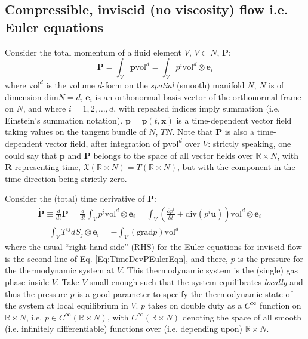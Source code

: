 \documentclass[10pt]{amsart}
\begin{document}
\begin{multicols*}{2}
\subsection{Compressible, inviscid (no viscosity) flow i.e. Euler equations}

Consider the total momentum of a fluid element $V$, $V \subset N$, $\mathbf{P}$:
\begin{equation}
  \mathbf{P} = \int_V \mathbf{p} \text{vol}^d = \int_V p^i \text{vol}^d \otimes \mathbf{e}_i
\end{equation}
where $\text{vol}^d$ is the volume $d$-form on the \emph{spatial} (smooth) manifold $N$, $N$ is of dimension $\text{dim}N = d$, $\mathbf{e}_i$ is an orthonormal basis vector of the orthonormal frame on $N$, and where $i=1,2, \dots , d$, with repeated indices imply summation (i.e. Einstein's summation notation).  $\mathbf{p} = \mathbf{p}(t,\mathbf{x})$ is a time-dependent vector field taking values on the tangent bundle of $N$, $TN$.  Note that $\mathbf{P}$ is also a time-dependent vector field, after integration of $\mathbf{p}\text{vol}^d$ over $V$: strictly speaking, one could say that $\mathbf{p}$ and $\mathbf{P}$ belongs to the space of all vector fields over $\mathbb{R}\times N$, with $\mathbf{R}$ representing time, $\mathfrak{X}(\mathbb{R}\times N) = T(\mathbb{R}\times N)$, but with the component in the time direction being strictly zero.  

Consider the (total) time derivative of $\mathbf{P}$:
\begin{equation}\label{Eq:TimeDevPEulerEqn}
  \begin{gathered}
    \dot{\mathbf{P}} \equiv \frac{d}{dt} \mathbf{P} = \frac{d}{dt} \int_V p^i \text{vol}^d\otimes \mathbf{e}_i = \int_V \left( \frac{ \partial p^i}{ \partial t} + \text{div}(p^i \mathbf{u}) \right)\text{vol}^d \otimes \mathbf{e}_i = \\
    = \int_V T^{ij} dS_j \otimes \mathbf{e}_i = -\int_V (\text{grad}p) \text{vol}^d
    \end{gathered}
  \end{equation}
where the usual ``right-hand side'' (RHS) for the Euler equations for inviscid flow is the second line of Eq. \ref{Eq:TimeDevPEulerEqn}, and there, $p$ is the pressure for the thermodynamic system at $V$.  This thermodynamic system is the (single) gas phase inside $V$.  Take $V$ small enough such that the system equilibrates \emph{locally} and thus the pressure $p$ is a good parameter to specify the thermodynamic state of the system at local equilibrium in $V$.  $p$ takes on double duty as a $C^{\infty}$ function on $\mathbb{R}\times N$, i.e. $p \in C^{\infty}(\mathbb{R}\times N)$, with $C^{\infty}(\mathbb{R}\times N)$ denoting the space of all smooth (i.e. infinitely differentiable) functions over (i.e. depending upon) $\mathbb{R}\times N$.


\end{multicols*}
\end{document}

